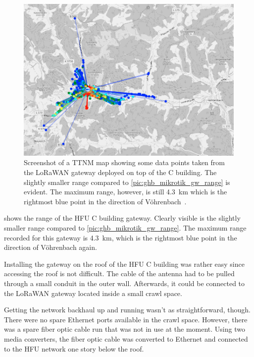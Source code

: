 \begin{figure}[htbp]
    \centering
    \includegraphics[width=1\textwidth]{pictures/ttn-mapper/gateway-ranges/c_building_gw_range.png}
    \caption{
        Screenshot of a \ac{TTNM} map showing some data points taken from the \ac{LoRaWAN} gateway deployed on top of the C building.
        The slightly smaller range compared to \cref{pic:ghb_mikrotik_gw_range} is evident.
        The maximum range, however, is still \SI{4.3}{\kilo\meter} which is the rightmost blue point in the direction of Vöhrenbach~\cite{ttn_mapper_ttn_2023}.
    }\label{pic:c_building_gw_range}
\end{figure}

 shows the range of the \ac{HFU} C building gateway.
Clearly visible is the slightly smaller range compared to \cref{pic:ghb_mikrotik_gw_range}.
The maximum range recorded for this gateway is \SI{4.3}{\kilo\meter}, which is the rightmost blue point in the direction of Vöhrenbach again.

Installing the gateway on the roof of the \ac{HFU} C building was rather easy since accessing the roof is not difficult.
The cable of the antenna had to be pulled through a small conduit in the outer wall.
Afterwards, it could be connected to the \ac{LoRaWAN} gateway located inside a small crawl space.

Getting the network backhaul up and running wasn't as straightforward, though.
There were no spare Ethernet ports available in the crawl space.
However, there was a spare fiber optic cable run that was not in use at the moment.
Using two media converters, the fiber optic cable was converted to Ethernet and connected to the \ac{HFU} network one story below the roof.

